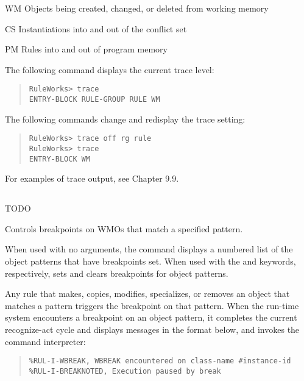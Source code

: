 {{WM  Objects being created, changed, or deleted from working
memory

CS  Instantiations into and out of the conflict set

PM  Rules into and out of program memory

\Example

The following command displays the current trace level:

\begin{quote}
\begin{verbatim}
RuleWorks> trace
ENTRY-BLOCK RULE-GROUP RULE WM
\end{verbatim}
 
\end{quote}

The following commands change and redisplay the trace
setting:

\begin{quote}
\begin{verbatim}
RuleWorks> trace off rg rule
RuleWorks> trace
ENTRY-BLOCK WM
\end{verbatim}
\end{quote}  

For examples of trace output, see Chapter 9.9.

\subsection{}
TODO

Controls breakpoints on WMOs that match a specified pattern.

When used with no arguments, the command displays a numbered list of
the object patterns that have breakpoints set. When used with the
 and  keywords, respectively,  sets and
clears breakpoints for object patterns.

Any rule that makes, copies, modifies, specializes, or removes an
object that matches a pattern triggers the breakpoint on that
pattern. When the run-time system encounters a breakpoint on an object
pattern, it completes the current recognize-act cycle and displays
messages in the format below, and invokes the command interpreter:

\begin{quote}
\begin{verbatim}
%RUL-I-WBREAK, WBREAK encountered on class-name #instance-id
%RUL-I-BREAKNOTED, Execution paused by break
\end{verbatim}
\end{quote}

}}
